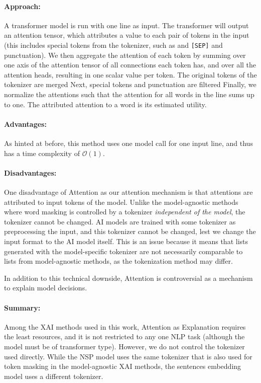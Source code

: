 \paragraph{Approach:}
A transformer model is run with one line as input.
The transformer will output an attention tensor, which attributes a value to each pair of tokens in the input (this includes special tokens from the tokenizer, such as and \texttt{[SEP]} and punctuation).
We then aggregate the attention of each token by summing over one axis of the attention tensor of all connections each token has, and over all the attention heads, resulting in one scalar value per token.
The original tokens of the tokenizer are merged
Next, special tokens and punctuation are filtered
Finally, we normalize the attentions such that the attention for all words in the line sums up to one.
The attributed attention to a word is its estimated utility.

\paragraph{Advantages:}
As hinted at before, this method uses one model call for one input line, and thus has a time complexity of $\mathcal{O}(1)$.

\paragraph{Disadvantages:}
One disadvantage of Attention as our attention mechanism is that attentions are attributed to input tokens of the model.
Unlike the model-agnostic methods where word masking is controlled by a tokenizer \textit{independent of the model}, the tokenizer cannot be changed.
AI models are trained with some tokenizer as preprocessing the input, and this tokenizer cannot be changed, lest we change the input format to the AI model itself.
This is an issue because it means that lists generated with the model-specific tokenizer are not necessarily comparable to lists from model-agnostic methods, as the tokenization method may differ.

In addition to this technical downside, Attention is controversial as a mechanism to explain model decisions.

\paragraph{Summary:}
Among the XAI methods used in this work, Attention as Explanation requires the least resources, and it is not restricted to any one NLP task (although the model must be of transformer type).
However, we do not control the tokenizer used directly.
While the NSP model uses the same tokenizer that is also used for token masking in the model-agnostic XAI methods, the sentences embedding model uses a different tokenizer.



